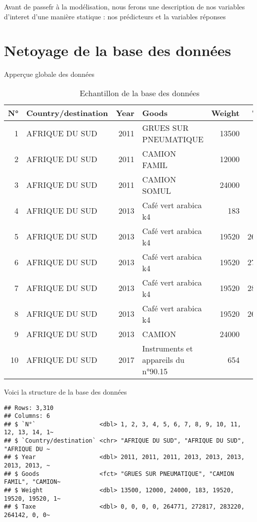 \documentclass[
]{book}
\begin{document}
Avant de passefr à la modélisation, nous ferons une description de nos variables d'interet d'une manière statique : nos prédicteurs et la variables réponses

\hypertarget{netoyage-de-la-base-des-donnuxe9es}{%
\section{Netoyage de la base des données}\label{netoyage-de-la-base-des-donnuxe9es}}

Apperçue globale des données

\begin{table}

\caption{\label{tab:unnamed-chunk-2}Echantillon de la base des données}
\centering
\begin{tabular}[t]{r|l|r|l|r|r}
\hline
N° & Country/destination & Year & Goods & Weight & Taxe\\
\hline
1 & AFRIQUE DU SUD & 2011 & GRUES SUR PNEUMATIQUE & 13500 & 0\\
\hline
2 & AFRIQUE DU SUD & 2011 & CAMION FAMIL & 12000 & 0\\
\hline
3 & AFRIQUE DU SUD & 2011 & CAMION SOMUL & 24000 & 0\\
\hline
4 & AFRIQUE DU SUD & 2013 & Café vert arabica k4 & 183 & 0\\
\hline
5 & AFRIQUE DU SUD & 2013 & Café vert arabica k4 & 19520 & 264771\\
\hline
6 & AFRIQUE DU SUD & 2013 & Café vert arabica k4 & 19520 & 272817\\
\hline
7 & AFRIQUE DU SUD & 2013 & Café vert arabica k4 & 19520 & 283220\\
\hline
8 & AFRIQUE DU SUD & 2013 & Café vert arabica k4 & 19520 & 264142\\
\hline
9 & AFRIQUE DU SUD & 2013 & CAMION & 24000 & 0\\
\hline
10 & AFRIQUE DU SUD & 2017 & Instruments et appareils du n°90.15 & 654 & 0\\
\hline
\end{tabular}
\end{table}

Voici la structure de la base des données

\begin{verbatim}
## Rows: 3,310
## Columns: 6
## $ `N°`                  <dbl> 1, 2, 3, 4, 5, 6, 7, 8, 9, 10, 11, 12, 13, 14, 1~
## $ `Country/destination` <chr> "AFRIQUE DU SUD", "AFRIQUE DU SUD", "AFRIQUE DU ~
## $ Year                  <dbl> 2011, 2011, 2011, 2013, 2013, 2013, 2013, 2013, ~
## $ Goods                 <fct> "GRUES SUR PNEUMATIQUE", "CAMION FAMIL", "CAMION~
## $ Weight                <dbl> 13500, 12000, 24000, 183, 19520, 19520, 19520, 1~
## $ Taxe                  <dbl> 0, 0, 0, 0, 264771, 272817, 283220, 264142, 0, 0~
\end{verbatim}
\end{document}
